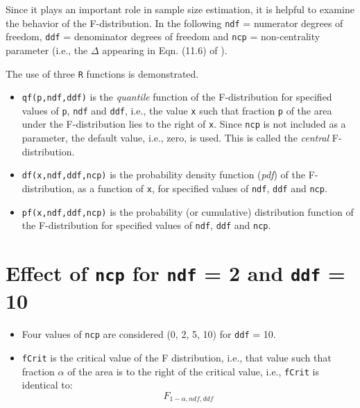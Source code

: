 \documentclass[
]{book}
\providecommand{\tightlist}{%
  \setlength{\itemsep}{0pt}\setlength{\parskip}{0pt}}
\begin{document}
Since it plays an important role in sample size estimation, it is helpful to examine the behavior of the F-distribution. In the following \texttt{ndf} = numerator degrees of freedom, \texttt{ddf} = denominator degrees of freedom and \texttt{ncp} = non-centrality parameter (i.e., the \(\Delta\) appearing in Eqn. (11.6) of \citep{RN2680}).

The use of three \texttt{R} functions is demonstrated.

\begin{itemize}
\item
  \texttt{qf(p,ndf,ddf)} is the \emph{quantile} function of the F-distribution for specified values of \texttt{p}, \texttt{ndf} and \texttt{ddf}, i.e., the value \texttt{x} such that fraction \texttt{p} of the area under the F-distribution lies to the right of \texttt{x}. Since \texttt{ncp} is not included as a parameter, the default value, i.e., zero, is used. This is called the \emph{central} F-distribution.
\item
  \texttt{df(x,ndf,ddf,ncp)} is the probability density function (\emph{pdf}) of the F-distribution, as a function of \texttt{x}, for specified values of \texttt{ndf}, \texttt{ddf} and \texttt{ncp}.
\item
  \texttt{pf(x,ndf,ddf,ncp)} is the probability (or cumulative) distribution function of the F-distribution for specified values of \texttt{ndf}, \texttt{ddf} and \texttt{ncp}.
\end{itemize}

\hypertarget{effect-of-ncp-for-ndf-2-and-ddf-10}{%
\section{\texorpdfstring{Effect of \texttt{ncp} for \texttt{ndf} = 2 and \texttt{ddf} = 10}{Effect of ncp for ndf = 2 and ddf = 10}}\label{effect-of-ncp-for-ndf-2-and-ddf-10}}

\begin{itemize}
\tightlist
\item
  Four values of \texttt{ncp} are considered (0, 2, 5, 10) for \texttt{ddf} = 10.
\item
  \texttt{fCrit} is the critical value of the F distribution, i.e., that value such that fraction \(\alpha\) of the area is to the right of the critical value, i.e., \texttt{fCrit} is identical to:
  \begin{equation*} 
  F_{1-\alpha ,ndf,ddf}
  \end{equation*}
\end{itemize}
\end{document}

